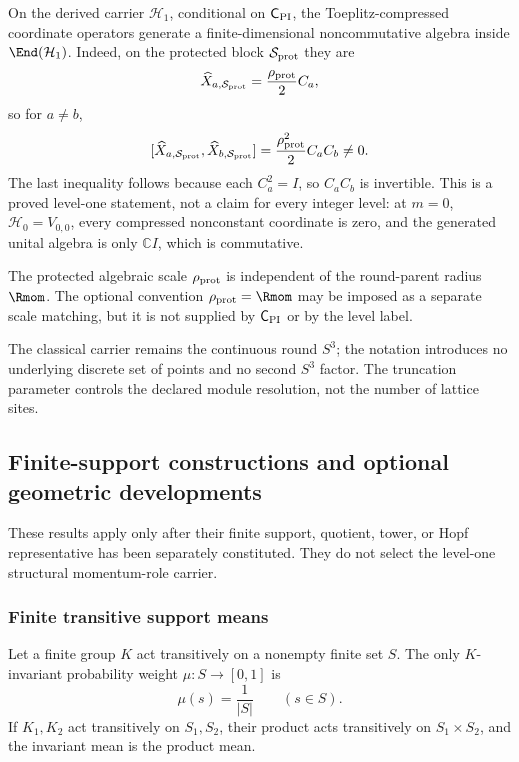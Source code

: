 \documentclass[11pt,a4paper]{article}
\begin{document}
\begin{remark}
\label{p2:rem:noncommutative}
On the derived carrier \(\mathcal H_1\), conditional on
\(\mathsf C_{\rm PI}\), the Toeplitz-compressed coordinate operators generate
a finite-dimensional noncommutative algebra inside
\(\End(\mathcal H_1)\).  Indeed, on the protected block
\(\mathcal S_{\rm prot}\) they are
\[
 \widehat X_{a,\mathcal S_{\rm prot}}=\frac{\rho_{\rm prot}}{2}C_a,
\]
so for \(a\ne b\),
\[
 [\widehat X_{a,\mathcal S_{\rm prot}},\widehat X_{b,\mathcal S_{\rm prot}}]
 =\frac{\rho_{\rm prot}^2}{2}C_aC_b\ne0.
\]
The last inequality follows because each \(C_a^2=I\), so \(C_aC_b\) is
invertible.  This is a proved level-one statement, not a claim for every
integer level: at \(m=0\), \(\mathcal H_0=V_{0,0}\), every compressed
nonconstant coordinate is zero, and the generated unital algebra is only
\(\mathbb C I\), which is commutative.

The protected algebraic scale \(\rho_{\rm prot}\) is independent of the
round-parent radius \(\Rmom\).  The optional convention
\(\rho_{\rm prot}=\Rmom\) may be imposed as a separate scale matching, but it
is not supplied by \(\mathsf C_{\rm PI}\) or by the level label.

The classical carrier remains the continuous round \(S^3\); the notation
introduces no underlying discrete set of points and no second \(S^3\) factor.
The truncation parameter controls the declared module resolution, not the
number of lattice sites.
\end{remark}


\subsection{Finite-support constructions and optional geometric developments}
\label{p2b:app:optional-finite-support}
These results apply only after their finite support, quotient, tower, or Hopf
representative has been separately constituted.  They do not select the
level-one structural momentum-role carrier.

\subsubsection{Finite transitive support means}
\begin{lemma}
\label{p2:lem:finite-transitive-invariant-mean}
Let a finite group \(K\) act transitively on a nonempty finite set \(S\).  The
only \(K\)-invariant probability weight \(\mu:S\to[0,1]\) is
\[
        \mu(s)=\frac1{|S|}\qquad(s\in S).
\]
If \(K_1,K_2\) act transitively on \(S_1,S_2\), their product acts transitively
on \(S_1\times S_2\), and the invariant mean is the product mean.
\end{lemma}
\end{document}
